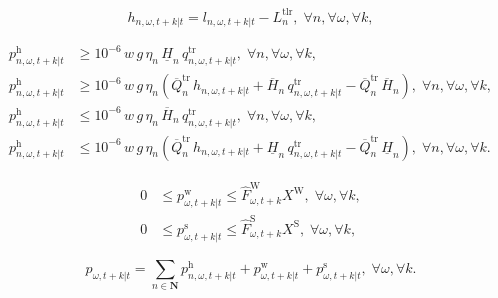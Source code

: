 \documentclass[10pt,a4paper]{amsart}
\begin{document}
\begin{equation}
\label{eq:cen_sto_head}
    h_{n, \omega, t+k|t} = l_{n, \omega, t+k|t} - L^{\mathrm{tlr}}_{n}, \; \forall n, \forall \omega, \forall k,
\end{equation}

\begin{align}
p^{\mathrm{h}}_{n, \omega, t+k|t} & \geq 10^{-6} \, w \, g \, \eta_n \, \underline{H}_{n} \, q^{\mathrm{tr}}_{n, \omega, t+k|t}, \; \forall n, \forall \omega, \forall k, \label{eq:cen_sto_McCormick1}\\
p^{\mathrm{h}}_{n, \omega, t+k|t} & \geq 10^{-6} \, w \, g \, \eta_n \left(\overline{Q}^{\mathrm{tr}}_{n} \, h_{n, \omega, t+k|t} + \overline{H}_{n} \, q^{\mathrm{tr}}_{n, \omega, t+k|t} - \overline{Q}^{\mathrm{tr}}_{n}  \, \overline{H}_{n}\right), \; \forall n, \forall \omega, \forall k, \label{eq:cen_sto_McCormick2}\\
p^{\mathrm{h}}_{n, \omega, t+k|t} & \leq 10^{-6} \, w \, g \, \eta_n \, \overline{H}_{n} \, q^{\mathrm{tr}}_{n, \omega, t+k|t}, \; \forall n, \forall \omega, \forall k, \label{eq:cen_sto_McCormick3}\\
p^{\mathrm{h}}_{n, \omega, t+k|t} & \leq 10^{-6} \, w \, g \, \eta_n \left(\overline{Q}^{\mathrm{tr}}_{n} \, h_{n, \omega, t+k|t} + \underline{H}_{n} \, q^{\mathrm{tr}}_{n, \omega, t+k|t} - \overline{Q}^{\mathrm{tr}}_n \, \underline{H}_{n}\right), \; \forall n, \forall \omega, \forall k. \label{eq:cen_sto_McCormick4}
\end{align}

\begin{align}
    0 & \leq p^{\mathrm{w}}_{\omega, t+k|t} \leq \hat{F}^{\mathrm{W}}_{\omega, t+k} X^{\mathrm{W}}, \; \forall \omega, \forall k, \label{eq:cen_sto_wind}\\
    0 & \leq p^{\mathrm{s}}_{\omega, t+k|t} \leq \hat{F}^{\mathrm{S}}_{\omega, t+k} X^{\mathrm{S}}, \; \forall \omega, \forall k, \label{eq:cen_sto_solar}
\end{align}

\begin{equation}
    p_{\omega, t+k|t} = \sum_{n \in \boldsymbol{N}} p^{\mathrm{h}}_{n, \omega, t+k|t} + p^{\mathrm{w}}_{\omega, t+k|t} + p^{\mathrm{s}}_{\omega, t+k|t}, \; \forall \omega, \forall k. \label{eq:cen_sto_power_balance}
\end{equation}
\end{document}
